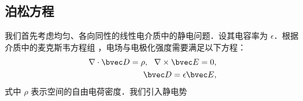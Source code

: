 
\subsection{泊松方程}
我们首先考虑均匀、各向同性的线性电介质中的静电问题．设其电容率为 $\epsilon$．根据介质中的麦克斯韦方程组 ，电场与电极化强度需要满足以下方程：
\begin{align}
\nabla \cdot \bvec D=\rho,\ \ \nabla \times \bvec E=0,\\
\bvec D=\epsilon \bvec E,
\end{align}
式中 $\rho$ 表示空间的自由电荷密度．我们引入静电势